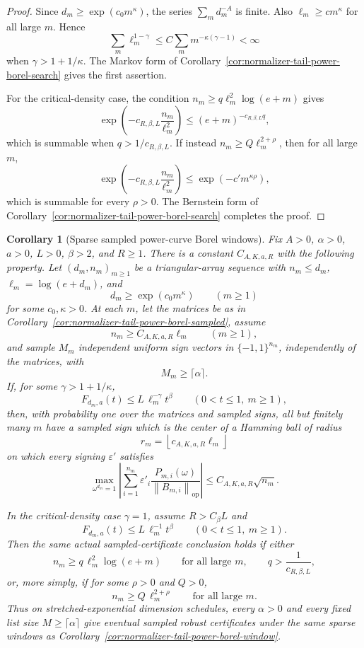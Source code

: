 \documentclass[11pt]{amsart}
\numberwithin{equation}{section}
\newtheorem{corollary}[theorem]{Corollary}
\theoremstyle{definition}
\theoremstyle{remark}
\newcommand{\op}{\mathrm{op}}
\newcommand{\norm}[1]{\left\lVert #1\right\rVert}
\newcommand{\eps}{\varepsilon}
\begin{document}
\begin{proof}
Since \(d_m\ge\exp(c_0m^\kappa)\), the series \(\sum_m d_m^{-A}\) is finite.
Also \(\ell_m\ge c m^\kappa\) for all large \(m\).  Hence
\[
  \sum_m \ell_m^{1-\gamma}
  \le C\sum_m m^{-\kappa(\gamma-1)}<\infty
\]
when \(\gamma>1+1/\kappa\).  The Markov form of
Corollary~\ref{cor:normalizer-tail-power-borel-search} gives the first
assertion.

For the critical-density case, the condition
\(n_m\ge q\ell_m^2\log(e+m)\) gives
\[
  \exp\left(-c_{R,\beta,L}\frac{n_m}{\ell_m^2}\right)
  \le (e+m)^{-c_{R,\beta,L}q},
\]
which is summable when \(q>1/c_{R,\beta,L}\).  If instead
\(n_m\ge Q\ell_m^{2+\rho}\), then for all large \(m\),
\[
  \exp\left(-c_{R,\beta,L}\frac{n_m}{\ell_m^2}\right)
  \le \exp(-c' m^{\kappa\rho}),
\]
which is summable for every \(\rho>0\).  The Bernstein form of
Corollary~\ref{cor:normalizer-tail-power-borel-search} completes the proof.
\end{proof}

\begin{corollary}[Sparse sampled power-curve Borel windows]
\label{cor:normalizer-tail-power-borel-window-sampled}
Fix \(A>0\), \(\alpha>0\), \(a>0\), \(L>0\), \(\beta>2\), and \(R\ge1\).
There is a constant \(C_{A,K,a,R}\) with the following property.  Let
\((d_m,n_m)_{m\ge1}\) be a triangular-array sequence with \(n_m\le d_m\),
\(\ell_m=\log(e+d_m)\), and
\[
  d_m\ge \exp(c_0m^\kappa)
  \qquad(m\ge1)
\]
for some \(c_0,\kappa>0\).  At each \(m\), let the matrices be as in
Corollary~\ref{cor:normalizer-tail-power-borel-sampled}, assume
\[
  n_m\ge C_{A,K,a,R}\ell_m
  \qquad(m\ge1),
\]
and sample \(M_m\) independent uniform sign vectors in \(\{-1,1\}^{n_m}\),
independently of the matrices, with
\[
  M_m\ge\lceil\alpha\rceil .
\]
If, for some \(\gamma>1+1/\kappa\),
\[
  F_{d_m,a}(t)\le L\,\ell_m^{-\gamma}t^\beta
  \qquad(0<t\le1,\ m\ge1),
\]
then, with probability one over the matrices and sampled signs, all but
finitely many \(m\) have a sampled sign which is the center of a Hamming ball of
radius
\[
  r_m=\left\lfloor c_{A,K,a,R}\ell_m\right\rfloor
\]
on which every signing \(\eps'\) satisfies
\[
  \max_{\omega^{d_m}=1}\left|\sum_{i=1}^{n_m}
  \eps'_i\frac{P_{m,i}(\omega)}{\norm{B_{m,i}}_{\op}}\right|
  \le C_{A,K,a,R}\sqrt{n_m}.
\]

In the critical-density case \(\gamma=1\), assume \(R>C_\beta L\) and
\[
  F_{d_m,a}(t)\le L\,\ell_m^{-1}t^\beta
  \qquad(0<t\le1,\ m\ge1).
\]
Then the same actual sampled-certificate conclusion holds if either
\[
  n_m\ge q\,\ell_m^2\log(e+m)
  \qquad\text{for all large }m,\qquad
  q>\frac1{c_{R,\beta,L}},
\]
or, more simply, if for some \(\rho>0\) and \(Q>0\),
\[
  n_m\ge Q\,\ell_m^{2+\rho}
  \qquad\text{for all large }m .
\]
Thus on stretched-exponential dimension schedules, every \(\alpha>0\) and every
fixed list size \(M\ge\lceil\alpha\rceil\) give eventual sampled robust
certificates under the same sparse windows as
Corollary~\ref{cor:normalizer-tail-power-borel-window}.
\end{corollary}
\end{document}

